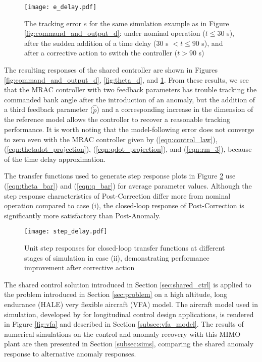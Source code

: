 \begin{figure}[h!]
	\centering
	\texttt{[image: e\_delay.pdf]}
	\caption{The tracking error $e$ for the same simulation example as in Figure \ref{fig:command_and_output_d}: under nominal operation ($t \leq 30$ s), after the sudden addition of a time delay ($30$ s $< t \leq 90$ s), and after a corrective action to switch the controller ($t > 90$ s)}
	\label{fig:error_d}
\end{figure}

The resulting responses of the shared controller are shown in Figures \ref{fig:command_and_output_d}, \ref{fig:theta_d}, and \ref{fig:error_d}. From these results, we see that the MRAC controller with two feedback parameters has trouble tracking the commanded bank angle after the introduction of an anomaly, but the addition of a third feedback parameter ($\hat{\dot{p}}$) and a corresponding increase in the dimension of the reference model allows the controller to recover a reasonable tracking performance. It is worth noting that the model-following error does not converge to zero even with the MRAC controller given by (\ref{eqn:control_law}), (\ref{eqn:thetadot_projection}), (\ref{eqn:qdot_projection}), and (\ref{eqn:rm_3}), because of the time delay approximation. 

The transfer functions used to generate step response plots in Figure \ref{fig:step_delay} use (\ref{eqn:theta_bar}) and (\ref{eqn:q_bar}) for average parameter values. Although the step response characteristics of Post-Correction differ more from nominal operation compared to case (i), the closed-loop response of Post-Correction is significantly more satisfactory than Post-Anomaly.

\begin{figure}[h!]
	\centering
	\texttt{[image: step\_delay.pdf]}
	\caption{Unit step responses for closed-loop transfer functions at different stages of simulation in case (ii), demonstrating performance improvement after corrective action}
	\label{fig:step_delay}
\end{figure}

The shared control solution introduced in Section \ref{sec:shared_ctrl} is applied to the problem introduced in Section \ref{sec:problem} on a high altitude, long endurance (HALE) very flexible aircraft (VFA) model. The aircraft model used in simulation, developed by \cite{gibson2011modeling} for longitudinal control design applications, is rendered in Figure \ref{fig:vfa} and described in Section \ref{subsec:vfa_model}. The results of numerical simulations on the control and anomaly recovery with this MIMO plant are then presented in Section \ref{subsec:sims}, comparing the shared anomaly response to alternative anomaly responses.

